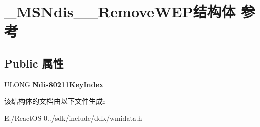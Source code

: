 \hypertarget{struct___m_s_ndis__80211___remove_w_e_p}{}\section{\+\_\+\+M\+S\+Ndis\+\_\+\_\+\+Remove\+W\+E\+P结构体 参考}
\label{struct___m_s_ndis__80211___remove_w_e_p}
\subsection*{Public 属性}
\begin{DoxyCompactItemize}
\item 
\mbox{\label{struct___m_s_ndis__80211___remove_w_e_p_aa1403321d7d9241b7fe2d2ed79b3a309}} 
U\+L\+O\+NG {\bfseries Ndis80211\+Key\+Index}
\end{DoxyCompactItemize}


该结构体的文档由以下文件生成\+:\begin{DoxyCompactItemize}
\item 
E\+:/\+React\+O\+S-\/0../sdk/include/ddk/wmidata.\+h\end{DoxyCompactItemize}
